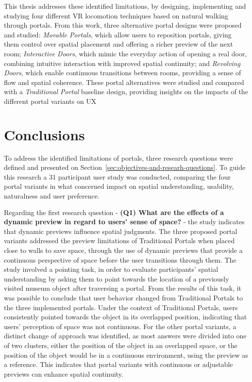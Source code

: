 This thesis addresses these identified limitations, by designing, implementing and studying four different \gls{VR} locomotion techniques 
based on natural walking through portals. From this work, three alternative portal designs were proposed and studied: 
\textit{Movable Portals}, which allow users to reposition portals, giving them control over spatial placement and offering 
a richer preview of the next room; \textit{Interactive Doors}, which mimic the everyday action of opening a real door, combining 
intuitive interaction with improved spatial continuity; and \textit{Revolving Doors}, which enable continuous transitions between rooms, 
providing a sense of flow and spatial coherence. These portal alternatives were studied and compared with a \textit{Traditional Portal} 
baseline design, providing insights on the impacts of the different portal variants on \gls{UX}

\section{Conclusions}
\label{sec:conclusions}

To address the identified limitations of portals, three research questions were defined and presented on 
Section~\ref{sec:objectives-and-researh-questions}. To guide this research a 31 participant user study was conducted, comparing the four portal 
variants in what concerned  impact on spatial understanding, usability, naturalness and user preference.

Regarding the first research question - \textbf{(Q1) What are the effects of a dynamic preview in regard to users' sense of space?} -
the study indicates that dynamic previews influence spatial judgments. 
The three proposed portal variants addressed the preview limitations of Traditional Portals when placed close to walls to save space, through the 
use of dynamic previews that provide a continuous perspective of space before the user transitions through them.
The study involved a pointing task, in order to evaluate participants' spatial understanding by
asking them to point towards the location of a previously visited museum object after traversing a portal.
From the results of this task, it was possible to conclude that user behavior changed from Traditional Portals to the three implemented portals.
Under the context of Traditional Portals, users consistently pointed towards the object in its overlapped position, indicating that users' perception 
of space was not continuous.
For the other portal variants, a distinct change of approach was identified, as most answers were divided into one of two clusters, either the 
position of the object in an overlapped space, or the position of the object would be in a continuous environment, using the preview as a reference. 
This indicates that portal variants with continuous or adjustable previews can enhance spatial continuity. 

